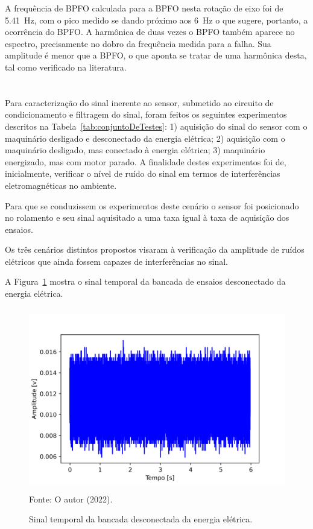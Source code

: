 \documentclass[
	12pt,				
	oneside,			
	a4paper,			
	english,			
	brazil,			
	]{abntex2ppgsi}
\begin{document}
A frequência de BPFO calculada para a BPFO nesta rotação de eixo foi de \SI{5.41}{\hertz}, com o pico medido se dando próximo aos \SI{6}{\hertz} o que sugere, portanto, a ocorrência do BPFO. A harmônica de duas vezes o BPFO também aparece no espectro, precisamente no dobro da frequência medida para a falha. Sua amplitude é menor que a BPFO, o que aponta se tratar de uma harmônica desta, tal como verificado na literatura.
 
\newpage
\section{}

Para caracterização do sinal inerente ao sensor, submetido ao circuito de condicionamento e filtragem do sinal, foram feitos os seguintes experimentos descritos na Tabela~\ref{tab:conjuntoDeTestes}: 1) aquisição do sinal do sensor com o maquinário desligado e desconectado da energia elétrica; 2) aquisição com o maquinário desligado, mas conectado à energia elétrica; 3) maquinário energizado, mas com motor parado. A finalidade destes experimentos foi de, inicialmente, verificar o nível de ruído do sinal em termos de interferências eletromagnéticas no ambiente.

Para que se conduzissem os experimentos deste cenário o sensor foi posicionado no rolamento e seu sinal aquisitado a uma taxa igual à taxa de aquisição dos ensaios. 

Os três cenários distintos propostos visaram à verificação da amplitude de ruídos elétricos que ainda fossem capazes de interferências no sinal. 

A Figura~\ref{maquina_desligada_da_tomada} mostra o sinal temporal da bancada de ensaios desconectado da energia elétrica. 

\begin{figure}[H]
\centering
\caption {Sinal temporal da bancada desconectada da energia elétrica.}
\includegraphics[width=\textwidth,height=80mm,keepaspectratio]{aquisicao_01_maquina_desligada_tomada_10_03_2022_08h53min_ajustado} \\
Fonte: O autor (2022).
\label{maquina_desligada_da_tomada}
\end{figure} 
\end{document}
